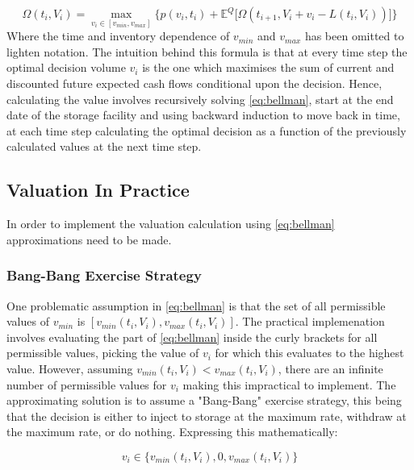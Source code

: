 \documentclass{article}
\begin{document}
\begin{equation}
    \label{eq:bellman}
    \Omega(t_i, V_i) = \max_{v_i \in [v_{min}, v_{max}]} \biggl\{ p(v_i, t_i) + \mathbb{E}^Q \biggl[
        \Omega(t_{i+1}, V_i + v_i - L(t_i, V_i)) \biggr] \biggr\}
\end{equation}
Where the time and inventory dependence of $v_{min}$ and $v_{max}$ has been omitted to lighten notation.
The intuition behind this formula is that at every time step the optimal decision volume $v_i$ 
is the one which maximises the sum of current and discounted future expected cash flows 
conditional upon the decision.
Hence, calculating the value involves recursively solving \ref{eq:bellman}, start at
the end date of the storage facility and using backward induction to move back in time, 
at each time step calculating the optimal decision as a function of the previously 
calculated values at the next time step.

\subsection{Valuation In Practice}
In order to implement the valuation calculation using \ref{eq:bellman} approximations need
to be made.

\subsubsection{Bang-Bang Exercise Strategy}
One problematic assumption in \ref{eq:bellman} is that the set of all permissible values of
$v_{min}$ is $[v_{min}(t_i, V_i), v_{max}(t_i, V_i)]$. The practical implemenation involves
evaluating the part of \ref{eq:bellman} inside the curly brackets for all permissible values,
picking the value of $v_i$ for which this evaluates to the highest value. However, assuming
$v_{min}(t_i, V_i) < v_{max}(t_i, V_i)$, there are an infinite number of permissible values for
$v_i$ making this impractical to implement. The approximating solution is to assume a 
"Bang-Bang" exercise strategy, this being that the decision is either to inject to storage
at the maximum rate, withdraw at the maximum rate, or do nothing. Expressing this mathematically:

\begin{equation}
    \label{eq:bb-dcsn-set}
    v_i \in \{v_{min}(t_i, V_i), 0, v_{max}(t_i, V_i)\}
\end{equation}
\end{document}
